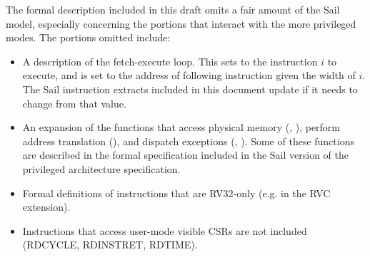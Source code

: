 
The formal description included in this draft omits a fair amount of
the Sail model, especially concerning the portions that interact with
the more privileged modes.  The portions omitted include:

\begin{itemize}
\item A description of the fetch-execute loop.  This sets 
  to the instruction $i$ to execute, and  is set to the
  address of following instruction given the width of $i$.  The Sail
  instruction extracts included in this document update
   if it needs to change from that value.
\item An expansion of the functions that access physical memory
  (, ), perform
  address translation (), and dispatch
  exceptions (,
  ).  Some of these functions are
  described in the formal specification included in the Sail version
  of the privileged architecture specification.
\item Formal definitions of instructions that are RV32-only (e.g. in
  the RVC extension).
\item Instructions that access user-mode visible CSRs are not included
  (RDCYCLE, RDINSTRET, RDTIME).
\end{itemize}
